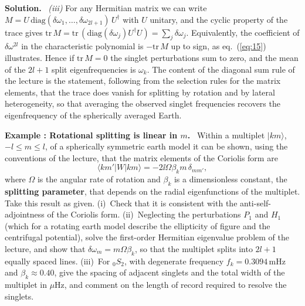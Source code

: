 \documentclass[a4paper,12pt]{paper}
\newcounter{example}
\renewenvironment{example}[1]{%
  \refstepcounter{example}%
  \begin{mdframed}[linewidth=1pt,innertopmargin=6pt,innerbottommargin=6pt]%
  \noindent\textbf{Example \theexample: #1.}\ }{%
  \end{mdframed}}
\newenvironment{solution}{\par\noindent\textbf{Solution.}\ }{\par\medskip}
\begin{document}
\begin{solution}
\medskip
\noindent\textit{(iii)} For any Hermitian matrix we can write $M=U\,\mathrm{diag}(\delta\omega_{1},\dots,\delta\omega_{2l+1})\,U^{\dagger}$
with $U$ unitary, and the cyclic property of the trace gives
$\mathrm{tr}\,M=\mathrm{tr}\,(\mathrm{diag}(\delta\omega_{j})U^{\dagger}U)=\sum_{j}\delta\omega_{j}$.
Equivalently, the coefficient of $\delta\omega^{2l}$ in the characteristic polynomial is
$-\mathrm{tr}\,M$ up to sign, as eq.~(\ref{eq:15}) illustrates. Hence if $\mathrm{tr}\,M=0$
the singlet perturbations sum to zero, and the mean of the $2l+1$ split eigenfrequencies is
$\omega_{k}$. The content of the diagonal sum rule of the lecture is the statement, following
from the selection rules for the matrix elements, that the trace does vanish for splitting by
rotation and by lateral heterogeneity, so that averaging the observed singlet frequencies
recovers the eigenfrequency of the spherically averaged Earth.
\end{solution}

\begin{example}{Rotational splitting is linear in $m$}
Within a multiplet $|km\rangle$, $-l\le m\le l$, of a spherically symmetric earth model it can
be shown, using the conventions of the lecture, that the matrix elements of the Coriolis form
are
\begin{equation*}
\langle km'|W|km\rangle=-2\ii\Omega\beta_{k}m\,\delta_{mm'},
\end{equation*}
where $\Omega$ is the angular rate of rotation and $\beta_{k}$ is a dimensionless constant,
the \textbf{splitting parameter}, that depends on the radial eigenfunctions of the multiplet.
Take this result as given. (i)~Check that it is consistent with the anti-self-adjointness of
the Coriolis form. (ii)~Neglecting the perturbations $P_{1}$ and $H_{1}$ (which for a rotating
earth model describe the ellipticity of figure and the centrifugal potential), solve the
first-order Hermitian eigenvalue problem of the lecture, and show that
$\delta\omega_{m}=m\Omega\beta_{k}$, so that the multiplet splits into $2l+1$ equally spaced
lines. (iii)~For ${}_{0}S_{2}$, with degenerate frequency $f_{k}=0.3094\,\mathrm{mHz}$ and
$\beta_{k}\approx0.40$, give the spacing of adjacent singlets and the total width of the
multiplet in $\mu\mathrm{Hz}$, and comment on the length of record required to resolve the
singlets.
\end{example}
\end{document}
